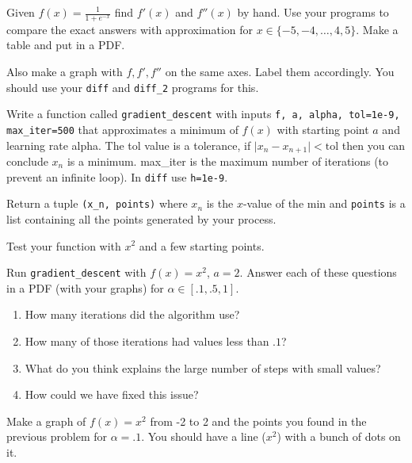 \documentclass[11pt,letterpaper]{article}
\begin{document}
\begin{problem}
 Given $f(x) =\frac{1}{1+e^{-x}}$ find $f'(x)$ and $f''(x)$ by hand. Use your programs to compare the exact answers with approximation for $x\in\{-5,-4,\dots,4,5\}$. Make a table and put in a PDF.
 
 Also make a graph with $f,f',f''$ on the same axes. Label them accordingly. You should use your \texttt{diff} and \texttt{diff\_2} programs for this.
\end{problem}





\begin{problem}
 Write a function called \texttt{gradient\_descent} with inputs \texttt{f, a, alpha, tol=1e-9, max\_iter=500} that approximates a minimum of $f(x)$ with starting point $a$ and learning rate alpha. The tol value is a tolerance, if $\vert x_n - x_{n+1}|<\textrm{tol}$ then you can conclude $x_n$ is a minimum. max\_iter is the maximum number of iterations (to prevent an infinite loop). In \texttt{diff} use \texttt{h=1e-9}.
 
 Return a tuple \texttt{(x\_n, points)} where $x_n$ is the $x$-value of the min and \texttt{points} is a list containing all the points generated by your process. 
 
 Test your function with $x^2$ and a few starting points.
\end{problem}


\begin{problem}
 Run \texttt{gradient\_descent} with $f(x) = x^2$, $a = 2$. Answer each of these questions in a PDF (with your graphs) for $\alpha \in [.1,.5,1]$.
 \begin{enumerate}
  \item How many iterations did the algorithm use? 
  \item How many of those iterations had values less than $.1$?
  \item What do you think explains the large number of steps with small values?
  \item How could we have fixed this issue?
 \end{enumerate}
\end{problem}


\begin{problem}
Make a graph of $f(x) = x^2$ from -2 to 2 and the points you found in the previous problem for $\alpha = .1$. You should have a line ($x^2$) with a bunch of dots on it. 
\end{problem}
\end{document}

